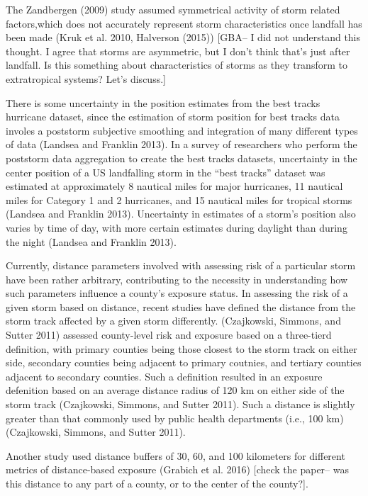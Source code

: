 \documentclass[]{elsarticle} %
\begin{document}
The Zandbergen (2009) study assumed symmetrical activity of storm
related factors,which does not accurately represent storm
characteristics once landfall has been made (Kruk et al. 2010, Halverson
(2015)) {[}GBA-- I did not understand this thought. I agree that storms
are asymmetric, but I don't think that's just after landfall. Is this
something about characteristics of storms as they transform to
extratropical systems? Let's discuss.{]}

There is some uncertainty in the position estimates from the best tracks
hurricane dataset, since the estimation of storm position for best
tracks data involes a poststorm subjective smoothing and integration of
many different types of data (Landsea and Franklin 2013). In a survey of
researchers who perform the poststorm data aggregation to create the
best tracks datasets, uncertainty in the center position of a US
landfalling storm in the ``best tracks'' dataset was estimated at
approximately 8 nautical miles for major hurricanes, 11 nautical miles
for Category 1 and 2 hurricanes, and 15 nautical miles for tropical
storms (Landsea and Franklin 2013). Uncertainty in estimates of a
storm's position also varies by time of day, with more certain estimates
during daylight than during the night (Landsea and Franklin 2013).

Currently, distance parameters involved with assessing risk of a
particular storm have been rather arbitrary, contributing to the
necessity in understanding how such parameters influence a county's
exposure status. In assessing the risk of a given storm based on
distance, recent studies have defined the distance from the storm track
affected by a given storm differently. (Czajkowski, Simmons, and Sutter
2011) assessed county-level risk and exposure based on a three-tierd
definition, with primary counties being those closest to the storm track
on either side, secondary counties being adjacent to primary coutnies,
and tertiary counties adjacent to secondary counties. Such a definition
resulted in an exposure defenition based on an average distance radius
of 120 km on either side of the storm track (Czajkowski, Simmons, and
Sutter 2011). Such a distance is slightly greater than that commonly
used by public health departments (i.e., 100 km) (Czajkowski, Simmons,
and Sutter 2011).

Another study used distance buffers of 30, 60, and 100 kilometers for
different metrics of distance-based exposure (Grabich et al. 2016)
{[}check the paper-- was this distance to any part of a county, or to
the center of the county?{]}.
\end{document}
